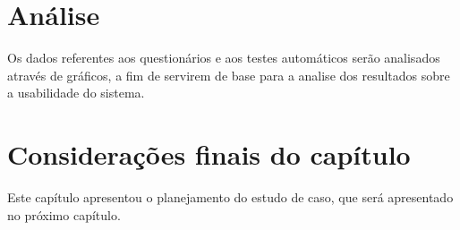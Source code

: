 
\section{Análise}

Os dados referentes aos questionários e aos testes automáticos serão analisados através de gráficos, a fim de servirem de base para a analise dos resultados sobre a usabilidade do sistema.

\section{Considerações finais do capítulo}

Este capítulo apresentou o planejamento do estudo de caso, que será apresentado no próximo capítulo.

